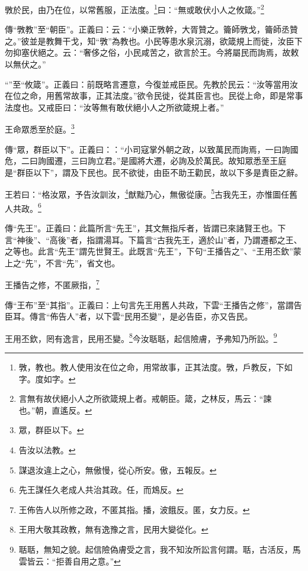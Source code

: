 斆於民，由乃在位，以常舊服，正法度。\footnote{斆，教也。教人使用汝在位之命，用常故事，正其法度。斆，戶教反，下如字。度如字。}曰：“無或敢伏小人之攸箴。”\footnote{言無有故伏絕小人之所欲箴規上者。戒朝臣。箴，之林反，馬云：“諫也。”朝，直遙反。}


{\noindent\zhuan{}\fzbyks 傳“斆教”至“朝臣”。正義曰：云：“小樂正斆幹，大胥贊之。籥師斆戈，籥師丞贊之。”彼並是教舞干戈，知“斆”為教也。小民等患水泉沉溺，欲箴規上而徙，汝臣下勿抑塞伏絕之。云：“奢侈之俗，小民咸苦之，欲言於王。今將屬民而詢焉，故敕以無伏之。” \par}

{\noindent\shu{}\fzkt “”至“攸箴”。正義曰：前既略言遷意，今復並戒臣民。先教於民云：“汝等當用汝在位之命，用舊常故事，正其法度。”欲令民徙，從其臣言也。民從上命，即是常事法度也。又戒臣曰：“汝等無有敢伏絕小人之所欲箴規上者。” \par}

王命眾悉至於庭。\footnote{眾，群臣以下。}

{\noindent\zhuan{}\fzbyks 傳“眾，群臣以下”。正義曰：：“小司寇掌外朝之政，以致萬民而詢焉，一曰詢國危，二曰詢國遷，三曰詢立君。”是國將大遷，必詢及於萬民。故知眾悉至王庭是“群臣以下”，謂及下民也。民不欲徙，由臣不助王勸民，故以下多是責臣之辭。 \par}

王若曰：“格汝眾，予告汝訓汝，\footnote{告汝以法教。}猷黜乃心，無傲從康。\footnote{謀退汝違上之心，無傲慢，從心所安。傲，五報反。}古我先王，亦惟圖任舊人共政。\footnote{先王謀任久老成人共治其政。任，而鴆反。}

{\noindent\zhuan{}\fzbyks 傳“先王”。正義曰：此篇所言“先王”，其文無指斥者，皆謂已來諸賢王也。下言“神後”、“高後”者，指謂湯耳。下篇言“古我先王，適於山”者，乃謂遷都之王、之等也。此言“先王”謂先世賢王。此既言“先王”，下句“王播告之”、“王用丕欽”蒙上之“先”，不言“先”，省文也。 \par}

王播告之修，不匿厥指，\footnote{王佈告人以所修之政，不匿其指。播，波餓反。匿，女力反。}

{\noindent\zhuan{}\fzbyks 傳“王布”至“其指”。正義曰：上句言先王用舊人共政，下雲“王播告之修”，當謂告臣耳。傳言“佈告人”者，以下雲“民用丕變”，是必告臣，亦又告民。 \par}

王用丕欽，罔有逸言，民用丕變。\footnote{王用大敬其政教，無有逸豫之言，民用大變從化。}今汝聒聒，起信險膚，予弗知乃所訟。\footnote{聒聒，無知之貌。起信險偽膚受之言，我不知汝所訟言何謂。聒，古活反，馬雲皆云：“拒善自用之意。”}


